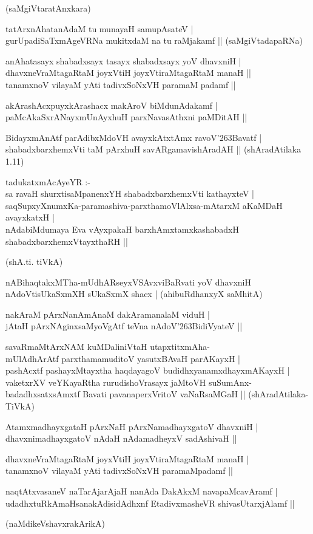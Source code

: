 \begin{itemize}
{\hfill{(saMgiVtaratAnxkara)} 
\item[47.] tatArxnAhatanAdaM tu munayaH samupAsateV |\\\label{151}
gurUpadiSaTxmAgeVRNa mukitxdaM na tu raMjakamf ||
\hfill{(saMgiVtadapaRNa)}
\item[48.] anAhatasayx shabadxsayx tasayx shabadxsayx yoV dhavxniH |\\\label{151a}
dhavxneVraMtagaRtaM joyxVtiH joyxVtiraMtagaRtaM manaH ||\\
tanamxnoV vilayaM yAti tadivxSoNxVH paramaM padamf ||
\item[49.] akArashAcxpuyxkArashacx makAroV biMdunAdakamf |\\\label{151b}
paMcAkaSxrANayxmUnAyxhuH parxNavasAthxni paMDitAH ||\label{161}
\item[50.] BidayxmAnAtf parAdibxMdoVH avayxkAtxtAmx ravoV\char'263Bavatf |\\\label{151c}
shabadxbarxhemxVti taM pArxhuH savARgamavishAradAH ||
\hfill{(shAradAtilaka 1.11)}
\item[51.] tadukatxmAcAyeYR :-\\
sa ravaH shurxtisaMpanenxYH shabadxbarxhemxVti kathayxteV |\\\label{151d}
saqSupxyXnumxKa-paramashiva-parxthamoVlAlxsa-mAtarxM aKaMDaH avayxkatxH |\\
nAdabiMdumaya Eva vAyxpakaH barxhAmxtamxkashabadxH shabadxbarxhemxVtayxthaRH ||

\hfill{(shA.ti. tiVkA)}
\item[52.] nABihaqtakxMTha-mUdhARseyxVSAvxviBaRvati yoV dhavxniH \\\label{151e}
nAdoVtisUkaSxmXH sUkaSxmX shacx |
\hfill{(ahibuRdhanxyX saMhitA)}
\item[53.] nakAraM pArxNanAmAnaM dakAramanalaM viduH |\\\label{151f}
jAtaH pArxNAginxsaMyoVgAtf teVna nAdoV\char'263BidiVyateV ||
\item[54.] savaRmaMtArxNAM kuMDaliniVtaH utapxtitxmAha-\\[3pt]
mUlAdhArAtf parxthamamuditoV yasutxBAvaH parAKayxH |\\\label{152}
pashAcxtf pashayxMtayxtha haqdayagoV budidhxyanamxdhayxmAKayxH |\\
vaketxrXV veYKayaRtha rurudishoVrasayx jaMtoVH suSumAnx-\\
badadhxsatxsAmxtf Bavati pavanaperxVritoV vaNaRsaMGaH ||
\hfill{(shAradAtilaka- TiVkA)}
\item[55.] AtamxmadhayxgataH pArxNaH pArxNamadhayxgatoV dhavxniH |\\\label{152a}
dhavxnimadhayxgatoV nAdaH nAdamadheyxV sadAshivaH ||
\item[56.] dhavxneVraMtagaRtaM joyxVtiH joyxVtiraMtagaRtaM manaH |\\
tanamxnoV vilayaM yAti tadivxSoNxVH paramaMpadamf ||
\item[57.] naqtAtxvasaneV naTarAjarAjaH nanAda DakAkxM navapaMcavAramf |\\\label{152b}
udadhxtuRkAmaHsanakAdisidAdhxnf EtadivxmasheVR shivasUtarxjAlamf ||

\hfill{(naMdikeVshavxrakArikA)}}
\end{itemize}
